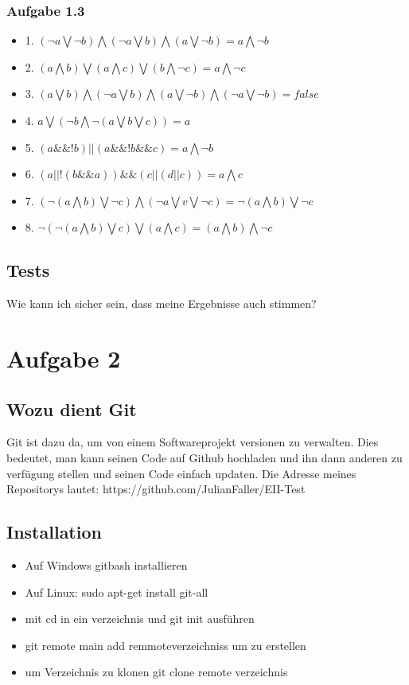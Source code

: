 \documentclass[a4paper,11pt,titlepage]{article}
\begin{document}
\subsubsection{Aufgabe 1.3}
\begin{itemize}
  \item 1. $(\neg a \bigvee \neg b) \bigwedge (\neg a \bigvee b) \bigwedge (a \bigvee \neg b) = a \bigwedge \neg b$
  \item 2. $(a \bigwedge b) \bigvee (a \bigwedge c) \bigvee (b \bigwedge \neg c) = a \bigwedge \neg c$
  \item 3. $(a \bigvee b) \bigwedge (\neg a \bigvee b) \bigwedge (a \bigvee \neg b) \bigwedge (\neg a \bigvee \neg b) = false$
  \item 4. $ a \bigvee (\neg b \bigwedge \neg (a \bigvee b \bigvee c)) = a$
  \item 5. $(a\&\&!b)||(a\&\&!b\&\&c) = a \bigwedge \neg b$
  \item 6. $(a||!(b\&\&a))\&\&(c||(d||c)) = a \bigwedge c$
  \item 7. $(\neg (a\bigwedge b)\bigvee \neg c) \bigwedge (\neg a \bigvee v \bigvee \neg c) = \neg (a \bigwedge b) \bigvee \neg c$
  \item 8. $\neg (\neg (a \bigwedge b) \bigvee c) \bigvee (a \bigwedge c) = (a \bigwedge b) \bigwedge \neg c$
\end{itemize}
\subsection{Tests}
Wie kann ich sicher sein, dass meine Ergebnisse auch stimmen?

\section{Aufgabe 2}
\subsection{Wozu dient Git}
Git ist dazu da, um von einem Softwareprojekt versionen zu verwalten. Dies bedeutet, man kann seinen Code auf Github hochladen und ihn dann anderen zu verfügung stellen und seinen Code einfach updaten. Die Adresse meines Repositorys lautet: https://github.com/JulianFaller/EII-Test

\subsection{Installation}
\begin{itemize}
  \item Auf Windows gitbash installieren
  \item Auf Linux: sudo apt-get install git-all
  \item mit cd in ein verzeichnis und git init ausführen
  \item git remote main add remmoteverzeichniss um zu erstellen
  \item um Verzeichnis zu klonen git clone remote verzeichnis
\end{itemize}
\end{document}

